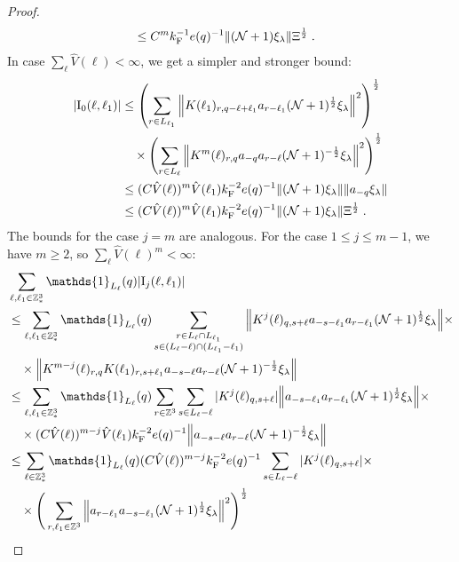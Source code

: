 \documentclass[12pt,a4paper]{article}
\numberwithin{equation}{section}
\newcommand{\1}{\mathbb{I}}
\newcommand{\F}{\mathrm{F}}
\newcommand{\I}{\mathrm{I}}
\newcommand{\Z}{\mathbb{Z}}
\newcommand{\NN}{\mathcal{N}}
\newcommand{\half}{\frac{1}{2}}
\theoremstyle{plain}
\theoremstyle{definition}
\theoremstyle{remark}
\theoremstyle{plain}
\theoremstyle{definition}
\theoremstyle{remark}
\begin{document}
\begin{proof}
\begin{align}
	&\leq C^m k_{\F}^{-1} e(q)^{-1}
		\norm{ (\NN+1) \xi_\lambda} \Xi^{\half} \;. \label{eq:estEQ2131_Coulomb}
\end{align}
In case $ \sum_\ell \hat{V}(\ell) < \infty $, we get a simpler and stronger bound:
\begin{align}
	|\I_0(\ell, \ell_1)| 	&\leq \left(\sum_{r\in L_{\ell_1}} \norm{ K(\ell_1)_{r,q-\ell+\ell_1} a_{r-\ell_1}(\NN+1)^{\half} \xi_\lambda}^2\right)^\half \nonumber\\
	& \quad \times 	\left(\sum_{r\in L_{\ell}} \norm{ K^m(\ell)_{r,q} a_{-q}a_{r-\ell} (\NN+1)^{-\half} \xi_\lambda }^2 \right)^\half \nonumber\\
	&\leq (C \hat{V}(\ell))^m \hat{V}(\ell_1) k_{\F}^{-2} e(q)^{-1} \norm{ (\NN+1) \xi_\lambda} \norm{ a_{-q} \xi_\lambda } \nonumber \\
	&\leq (C \hat{V}(\ell))^m
		\hat{V}(\ell_1)
		k_{\F}^{-2} e(q)^{-1}
		\norm{ (\NN+1) \xi_\lambda} \Xi^{\half} \;. \label{eq:estEQ2131}
\end{align}
The bounds for the case $j=m$ are analogous. For the case $ 1 \le j \le m-1 $, we have $ m \ge 2 $, so $ \sum_\ell \hat{V}(\ell)^m < \infty $:
\begin{align}
	&\sum_{\ell,\ell_1 \in \Z^3_*} \mathds{1}_{L_\ell}(q) |\I_j(\ell, \ell_1)| \nonumber\\
	&\leq \sum_{\ell,\ell_1 \in \Z^3_*} \mathds{1}_{L_\ell}(q) \sum\limits_{\substack{r\in L_{\ell} \cap L_{\ell_1}\\ s \in (L_{\ell} - \ell) \cap (L_{\ell_1} - \ell_1)}}
		\norm{ K^{j}(\ell)_{q,s+\ell} a_{-s-\ell_1} a_{r-\ell_1} (\NN+1)^{\half} \xi_\lambda} \nonumber \times \\ 
	&\quad \times \norm{ K^{m-j}(\ell)_{r,q} K(\ell_1)_{r,s+\ell_1} a_{-s-\ell}a_{r-\ell} (\NN+1)^{-\half} \xi_\lambda } \nonumber\\
	&\leq \sum_{\ell,\ell_1 \in \Z^3_*} \mathds{1}_{L_\ell}(q)
		\sum_{r\in \Z^3} \sum_{s \in L_{\ell} - \ell}
		|K^{j}(\ell)_{q,s+\ell}|
		\norm{ a_{-s-\ell_1} a_{r-\ell_1} (\NN+1)^{\half} \xi_\lambda} \times \nonumber\\
	&\quad \times (C \hat{V}(\ell))^{m-j} \hat{V}(\ell_1) k_{\F}^{-2} e(q)^{-1}
		\norm{ a_{-s-\ell}a_{r-\ell} (\NN+1)^{-\half} \xi_\lambda } \nonumber\\
	&\leq \sum_{\ell \in \Z^3_*} \mathds{1}_{L_\ell}(q) (C \hat{V}(\ell))^{m-j} k_{\F}^{-2} e(q)^{-1}
		\sum_{s \in L_{\ell} - \ell}
		|K^{j}(\ell)_{q,s+\ell}| \times \nonumber\\
	&\quad \times \Bigg( \sum_{r,\ell_1 \in \Z^3} \norm{a_{r-\ell_1} a_{-s-\ell_1} (\NN+1)^{\half} \xi_\lambda}^2 \Bigg)^{\half}

\end{align}
\end{proof}
\end{document}
